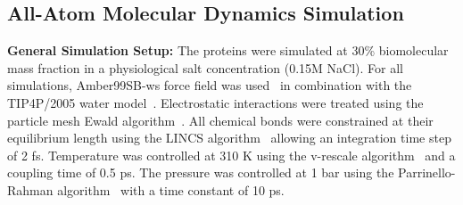 \documentclass[journal=jacsat,manuscript=article]{achemso}
\begin{document}
\subsection*{All-Atom Molecular Dynamics Simulation}



 
{\bf General Simulation Setup: }The proteins were simulated at 30\% biomolecular mass fraction in  a physiological salt concentration (0.15M NaCl). For all simulations, Amber99SB-ws force field was used~\cite{Best2014a} in combination with the TIP4P/2005 water model~\cite{Abascal2005b}. Electrostatic interactions were treated using the particle mesh Ewald algorithm~\cite{Essmann1995a}. All chemical bonds were constrained at their equilibrium length using the LINCS algorithm~\cite{Hess2008b} allowing an integration time step of 2 fs. Temperature was controlled at 310 K using the v-rescale algorithm~\cite{Bussi2007a} and a coupling time of 0.5 ps. The pressure was controlled at 1 bar using the Parrinello-Rahman algorithm~\cite{Parrinello1981a} with a time constant of 10 ps.  
\end{document}
